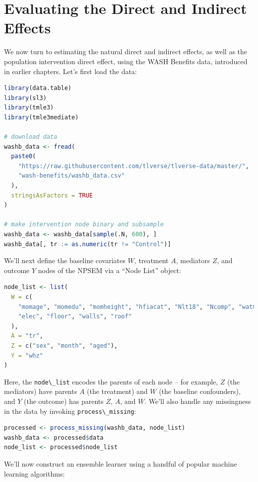 \documentclass[
  12pt, krantz2,
]{krantz}
\newcommand{\passthrough}[1]{#1}
\newcommand{\1}{\mathbbm{1}}
\theoremstyle{definition}
\theoremstyle{definition}
\theoremstyle{definition}
\theoremstyle{definition}
\theoremstyle{remark}
\begin{document}
\hypertarget{evaluating-the-direct-and-indirect-effects}{%
\section{Evaluating the Direct and Indirect Effects}\label{evaluating-the-direct-and-indirect-effects}}

We now turn to estimating the natural direct and indirect effects, as well as
the population intervention direct effect, using the WASH Benefits data,
introduced in earlier chapters. Let's first load the data:

\begin{lstlisting}[language=R]
library(data.table)
library(sl3)
library(tmle3)
library(tmle3mediate)

# download data
washb_data <- fread(
  paste0(
    "https://raw.githubusercontent.com/tlverse/tlverse-data/master/",
    "wash-benefits/washb_data.csv"
  ),
  stringsAsFactors = TRUE
)

# make intervention node binary and subsample
washb_data <- washb_data[sample(.N, 600), ]
washb_data[, tr := as.numeric(tr != "Control")]
\end{lstlisting}

We'll next define the baseline covariates \(W\), treatment \(A\), mediators \(Z\),
and outcome \(Y\) nodes of the NPSEM via a ``Node List'' object:

\begin{lstlisting}[language=R]
node_list <- list(
  W = c(
    "momage", "momedu", "momheight", "hfiacat", "Nlt18", "Ncomp", "watmin",
    "elec", "floor", "walls", "roof"
  ),
  A = "tr",
  Z = c("sex", "month", "aged"),
  Y = "whz"
)
\end{lstlisting}

Here, the \passthrough{\lstinline!node\_list!} encodes the parents of each node -- for example, \(Z\) (the
mediators) have parents \(A\) (the treatment) and \(W\) (the baseline confounders),
and \(Y\) (the outcome) has parents \(Z\), \(A\), and \(W\). We'll also handle any
missingness in the data by invoking \passthrough{\lstinline!process\_missing!}:

\begin{lstlisting}[language=R]
processed <- process_missing(washb_data, node_list)
washb_data <- processed$data
node_list <- processed$node_list
\end{lstlisting}

We'll now construct an ensemble learner using a handful of popular machine
learning algorithms:
\end{document}
